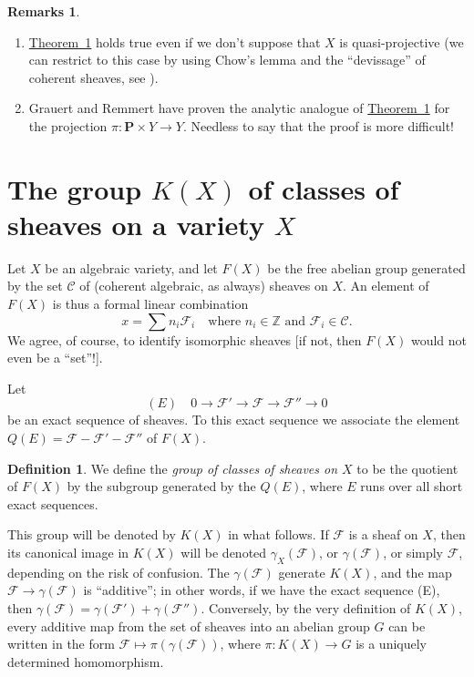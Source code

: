 \documentclass{article}
\theoremstyle{plain}
\theoremstyle{definition}
\newtheorem*{remarks}{Remarks}
\newtheorem*{definition}{Definition}
\newcommand{\scr}[1]{{\mathscr{#1}}}
\renewcommand{\cal}[1]{{\mathcal{#1}}}
\newcommand{\PP}{\mathbf{P}}
\newcommand{\oldpage}[1]{\marginpar{\footnotesize$\Big\vert$ \textit{p.~#1}}}
\begin{document}
\begin{remarks}
  \begin{enumerate}
    \item \hyperref[theorem1]{Theorem~1} holds true even if we don't suppose that $X$ is quasi-projective (we can restrict to this case by using Chow's lemma and the ``devissage'' of coherent sheaves, see \cite{6}).
    \item Grauert and Remmert have proven the analytic analogue of \hyperref[theorem1]{Theorem~1} for the projection $\pi\colon\PP\times Y\to Y$.
      Needless to say that the proof is more difficult!
  \end{enumerate}
\end{remarks}


\section{The group \texorpdfstring{$K(X)$}{K(X)} of classes of sheaves on a variety \texorpdfstring{$X$}{X}}
\label{section4}

\oldpage{105}
Let $X$ be an algebraic variety, and let $F(X)$ be the free abelian group generated by the set $\cal{C}$ of (coherent algebraic, as always) sheaves on $X$.
An element of $F(X)$ is thus a formal linear combination
\[
  x = \sum n_i\scr{F}_i
  \quad
  \mbox{where $n_i\in\mathbb{Z}$ and $\scr{F}_i\in\cal{C}$.}
\]
We agree, of course, to identify isomorphic sheaves [if not, then $F(X)$ would not even be a ``set''!].

Let
\[
  (E)\quad
  0\to\scr{F}'\to\scr{F}\to\scr{F''}\to0
\]
be an exact sequence of sheaves.
To this exact sequence we associate the element $Q(E)=\scr{F}-\scr{F}'-\scr{F}''$ of $F(X)$.

\begin{definition}
  We define the \emph{group of classes of sheaves on $X$} to be the quotient of $F(X)$ by the subgroup generated by the $Q(E)$, where $E$ runs over all short exact sequences.
\end{definition}

This group will be denoted by $K(X)$ in what follows.
If $\scr{F}$ is a sheaf on $X$, then its canonical image in $K(X)$ will be denoted $\gamma_X(\scr{F})$, or $\gamma(\scr{F})$, or simply $\scr{F}$, depending on the risk of confusion.
The $\gamma(\scr{F})$ generate $K(X)$, and the map $\scr{F}\to\gamma(\scr{F})$ is ``additive'';
in other words, if we have the exact sequence (E), then $\gamma(\scr{F})=\gamma(\scr{F}')+\gamma(\scr{F}'')$.
Conversely, by the very definition of $K(X)$, every additive map from the set of sheaves into an abelian group $G$ can be written in the form $\scr{F}\mapsto\pi(\gamma(\scr{F}))$, where $\pi\colon K(X)\to G$ is a uniquely determined homomorphism.
\end{document}
